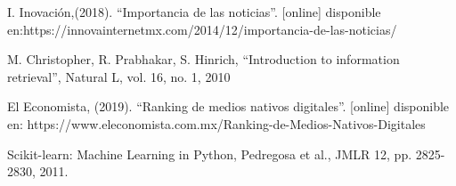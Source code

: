 

\begin{thebibliography}{99}

 I. Inovación,(2018). ``Importancia de las noticias''. [online] disponible en:https://innovainternetmx.com/2014/12/importancia-de-las-noticias/


 M. Christopher, R. Prabhakar, S. Hinrich, ``Introduction to information retrieval'', Natural L, vol. 16, no. 1, 2010

 El Economista, (2019). ``Ranking de medios nativos digitales''. [online] disponible en: https://www.eleconomista.com.mx/Ranking-de-Medios-Nativos-Digitales

 Scikit-learn: Machine Learning in Python, Pedregosa et al., JMLR 12, pp. 2825-2830, 2011.


\end{thebibliography}

